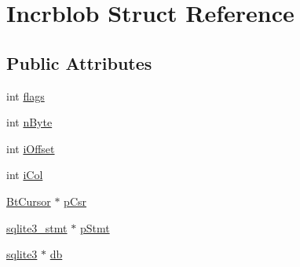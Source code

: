 \hypertarget{struct_incrblob}{\section{Incrblob Struct Reference}
\label{struct_incrblob}
}
\subsection*{Public Attributes}
\begin{DoxyCompactItemize}
\item 
int \hyperlink{struct_incrblob_a46fa093e5241305f28d02926f8d0846f}{flags}
\item 
int \hyperlink{struct_incrblob_ab1e1439df086208173fa97003f0ee02b}{n\-Byte}
\item 
int \hyperlink{struct_incrblob_af8e71744f43178967460b9f402e7fafd}{i\-Offset}
\item 
int \hyperlink{struct_incrblob_a398a322b061fb9952bc155026976ba51}{i\-Col}
\item 
\hyperlink{struct_bt_cursor}{Bt\-Cursor} $\ast$ \hyperlink{struct_incrblob_af5a24b18473d1449c8c3fe7d826de59a}{p\-Csr}
\item 
\hyperlink{sqlite3_8c_af2a033da1327cdd77f0a174a09aedd0c}{sqlite3\-\_\-stmt} $\ast$ \hyperlink{struct_incrblob_a8b7b39c9372db552add74c69f14a61a3}{p\-Stmt}
\item 
\hyperlink{structsqlite3}{sqlite3} $\ast$ \hyperlink{struct_incrblob_a9d3fe0b0229b75b9d0f9ee8e6545b5bc}{db}
\end{DoxyCompactItemize}


